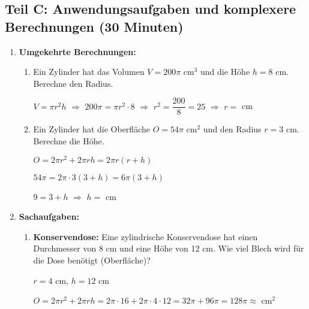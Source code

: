 \subsection*{Teil C: Anwendungsaufgaben und komplexere Berechnungen (30 Minuten)}

\begin{enumerate}[label=\arabic*., resume]

    \item \textbf{Umgekehrte Berechnungen:}
    \vspace{0.5cm}

    \begin{enumerate}[label=\alph*)]
        \item Ein Zylinder hat das Volumen $V = 200\pi$ cm$^3$ und die Höhe $h = 8$ cm. Berechne den Radius.

        $V = \pi r^2 h$ $\Rightarrow$ $200\pi = \pi r^2 \cdot 8$ $\Rightarrow$ $r^2 = \dfrac{200}{8} = 25$ $\Rightarrow$ $r =$ \underline{\hspace{2cm}} cm

        \vspace{0.5cm}
        \item Ein Zylinder hat die Oberfläche $O = 54\pi$ cm$^2$ und den Radius $r = 3$ cm. Berechne die Höhe.

        $O = 2\pi r^2 + 2\pi rh = 2\pi r(r + h)$

        $54\pi = 2\pi \cdot 3(3 + h) = 6\pi(3 + h)$

        $9 = 3 + h$ $\Rightarrow$ $h =$ \underline{\hspace{2cm}} cm
    \end{enumerate}

    \vspace{1cm}

    \item \textbf{Sachaufgaben:}
    \vspace{0.5cm}

    \begin{enumerate}[label=\alph*)]
        \item \textbf{Konservendose:} Eine zylindrische Konservendose hat einen Durchmesser von 8 cm und eine Höhe von 12 cm. Wie viel Blech wird für die Dose benötigt (Oberfläche)?

        $r = 4$ cm, $h = 12$ cm

        $O = 2\pi r^2 + 2\pi rh = 2\pi \cdot 16 + 2\pi \cdot 4 \cdot 12 = 32\pi + 96\pi = 128\pi \approx$ \underline{\hspace{2cm}} cm$^2$


\end{enumerate}
\end{enumerate}
